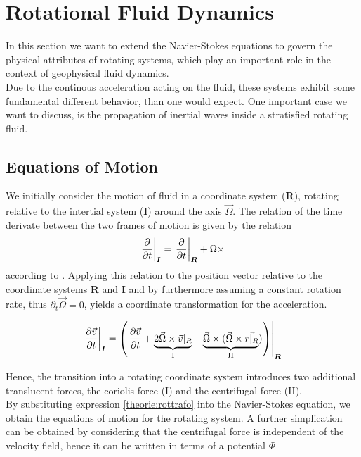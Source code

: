 \section{Rotational Fluid Dynamics}

In this section we want to extend the Navier-Stokes equations to govern the physical attributes of rotating systems,
which play an important role in the context of geophysical fluid dynamics.\\
Due to the continous acceleration acting on the fluid, these systems exhibit some fundamental different behavior, than one would expect.
One important case we want to discuss, is the propagation of inertial waves inside a stratisfied rotating fluid.\\

\subsection{Equations of Motion}
\label{THEORIE:ROT}

We initially consider the motion of fluid in a coordinate system (\textbf{R}), rotating relative to the intertial system (\textbf{I}) around the axis $\vec{\Omega}$.
The relation of the time derivate between the two frames of motion is given by the relation
\begin{align}
    \left.{\pdn[]{t}}\right|_{\bm{I}} = \left.\pdn[]{t}\right|_{\bm{R}} + \Omega \times
\end{align}
according to \citep{Tilgner2007}.
Applying this relation to the position vector relative to the coordinate systems \textbf{R} and \textbf{I}
and by furthermore assuming a constant rotation rate, thus $\partial_t\vec{\Omega} = 0$, yields a coordinate transformation for the acceleration.

\begin{align}
    \label{theorie:rottrafo}
    \left.\pdn[\vec{v}]{t}\right|_{\bm{I}} = \left(\left.\pdn[\vec{v}]{t}  + \underbrace{2\vec{\Omega} \times \vec{v}|_R}_{\text{I}}
    - \underbrace{\vec{\Omega} \times (\vec{\Omega} \times \vec{r|_R}}_{\text{II}})\right)\right|_{\bm{R}}
\end{align}

Hence, the transition into a rotating coordinate system introduces two additional translucent forces, the coriolis force (I)  and the centrifugal force (II).\\
By substituting expression \ref{theorie:rottrafo} into the Navier-Stokes equation, we obtain the equations of motion for the rotating system.
A further simplication can be obtained by considering that the centrifugal force is independent of the velocity field,
hence it can be written in terms of a potential $\Phi$

